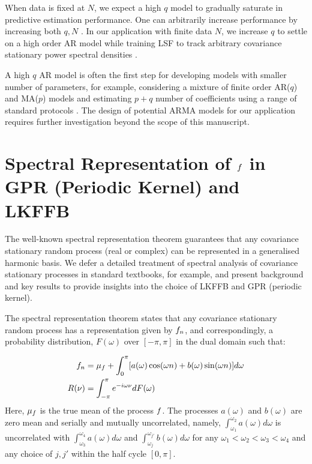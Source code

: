 When data is fixed at $N$, we expect a high $q$ model to gradually saturate in predictive estimation performance. One can arbitrarily increase performance by increasing both $q, N$ \cite{wahlberg1989estimation}.  In our application with finite data $N$, we increase $q$ to settle on a high order AR model while training LSF to track arbitrary covariance stationary power spectral densities \cite{brockwell1996introduction}.

A high $q$ AR model is often the first step for developing models with smaller number of parameters, for example, considering a mixture of finite order AR($q$) and MA($p$) models and estimating $p+q$ number of coefficients using a range of standard protocols \cite{brockwell1996introduction,west1996bayesian}. The design of potential ARMA models for our application requires further investigation beyond the scope of this manuscript.

\clearpage
\section{Spectral Representation of $f$ in GPR (Periodic Kernel) and LKFFB} \label{sec:app:spec_methods}

 The well-known spectral representation theorem guarantees that any covariance stationary random process (real or complex) can be represented in a generalised harmonic basis.  We defer a detailed treatment of spectral analysis of covariance stationary processes in standard textbooks, for example, \cite{hamilton1994time,karlin1975first} and present background and key results to provide insights into the choice of LKFFB and GPR (periodic kernel).
 
 The spectral representation theorem states that any covariance stationary random process has a representation given by $f_n$, and correspondingly,  a probability distribution, $F(\omega)$ over $[-\pi, \pi]$ in the dual domain such that:
 
\begin{align}
f_n & = \mu_f + \int_{0}^{\pi} [ a(\omega) \cos(\omega n) +  b(\omega) \sin(\omega n) ] d\omega \\
R(\nu) & = \int_{-\pi}^{\pi} e^{-i\omega \nu } dF(\omega)
\end{align}
Here, $\mu_f $ is the true mean of the process $f$.  The processes $a(\omega) $ and $b(\omega)$ are zero mean and serially and mutually uncorrelated, namely, $\int_{\omega_1}^{\omega_{2}} a(\omega) d\omega$ is uncorrelated with $\int_{\omega_3}^{\omega_{4}} a(\omega) d\omega$ and $\int_{\omega_j}^{\omega_{j'}} b(\omega) d\omega$ for any $\omega_1 < \omega_2 < \omega_3 < \omega_4$ and any choice of $j, j'$ within the half cycle  $[0, \pi]$.

